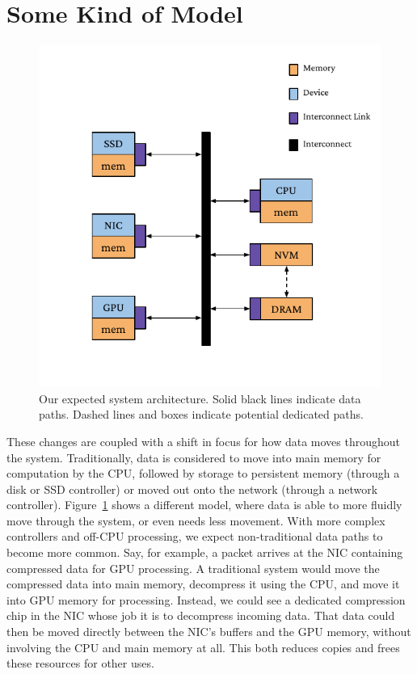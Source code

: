 \section{Some Kind of Model}
\begin{figure}
    \centering
    \includegraphics[width=\linewidth]{fig/gen_sys_diag}
    \caption[Expected hardware system architecture]{Our expected system architecture. Solid black lines indicate data paths. Dashed lines and boxes indicate potential dedicated paths.}
    \label{fig:sys_arch}
\end{figure}


These changes are coupled with a shift in focus for how data moves throughout the system.
Traditionally, data is considered to move into main memory for computation by the CPU, followed by
storage to persistent memory (through a disk or SSD controller) or moved out onto the network
(through a network controller). Figure~\ref{fig:sys_arch} shows a different model, where data is able to more
fluidly move
through the system, or even needs less movement. With more complex controllers and off-CPU processing, we expect
non-traditional data paths to become more common. Say, for example, a packet arrives at the NIC
containing compressed data for GPU processing. A traditional system would move the compressed data
into main memory, decompress it using the CPU, and move it into GPU memory for processing. Instead,
we could see a dedicated compression chip in the NIC whose job it is to decompress incoming data.
That data could then be moved directly between the NIC's buffers and the GPU memory, without involving
the CPU and main memory at all. This both reduces copies and frees these
resources for other uses.

